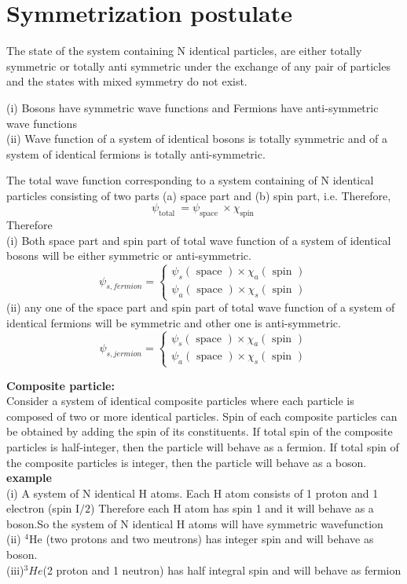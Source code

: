\section{Symmetrization postulate}
The state of the system containing $\mathrm{N}$ identical particles, are either totally symmetric or totally anti symmetric under the exchange of any pair of particles and the states with mixed symmetry do not exist.
\begin{note}
	(i) Bosons have symmetric wave functions and Fermions have anti-symmetric wave functions\\
	(ii) Wave function of a system of identical bosons is totally symmetric and of a system of identical fermions is totally anti-symmetric.
	
	The total wave function corresponding to a system containing of $\mathrm{N}$ identical particles consisting of two parts (a) space part and (b) spin part, i.e.
	Therefore,
	$$
	\psi_{\text {total }}=\psi_{\text {space }} \times \chi_{\text {spin }}
	$$
	Therefore\\
	(i) Both space part and spin part of total wave function of a system of identical bosons will be either symmetric or anti-symmetric.
	$$
	\psi_{s, f e r m i o n}=\left\{\begin{array}{l}
	\psi_{s}(\text { space }) \times \chi_{a}(\text { spin }) \\
	\psi_{a}(\text { space }) \times \chi_{s}(\text { spin })
	\end{array}\right.
	$$
	(ii) any one of the space part and spin part of total wave function of a system of identical fermions will be symmetric and other one is anti-symmetric.
	$$
	\psi_{s, j e r m i o n}=\left\{\begin{array}{l}
	\psi_{s}(\text { space }) \times \chi_{a}(\text { spin }) \\
	\psi_{a}(\text { space }) \times \chi_{s}(\text { spin })
	\end{array}\right.
	$$
	\end{note}
	\textbf{Composite particle:}\\
Consider a system of identical composite particles where each particle is composed of two or more identical particles. Spin of each composite particles can be obtained by adding the spin of its constituents. If total spin of the composite particles is half-integer, then the particle will behave as a fermion. If total spin of the composite particles is integer, then the particle will behave as a boson.\\
\textbf{example} \\
(i) A system of $\mathrm{N}$ identical $\mathrm{H}$ atoms. Each $\mathrm{H}$ atom consists of 1 proton and 1 electron (spin $\mathrm{I} / 2$) Therefore each H atom has spin 1 and it will behave as a boson.So the system of N identical H atoms will have symmetric wavefunction\\
(ii) ${ }^{4} \mathrm{He}$ (two protons and two meutrons) has integer spin and will behave as boson.\\
(iii)$^3He$(2 proton and 1 neutron) has half integral spin and will behave as fermion
